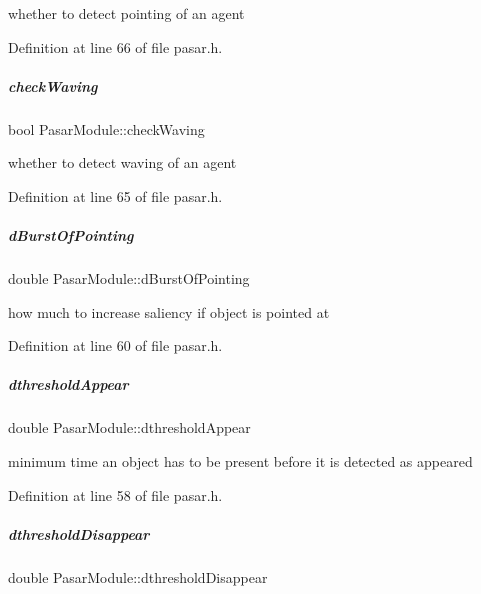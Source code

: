whether to detect pointing of an agent 



Definition at line 66 of file pasar.\+h.

\mbox{\label{group__pasar_a1565ab479eb670f9b0f2fac851d04d4f}} 
\subparagraph{\texorpdfstring{check\+Waving}{checkWaving}}
{\footnotesize\ttfamily bool Pasar\+Module\+::check\+Waving\hspace{0.3cm}{\ttfamily [protected]}}



whether to detect waving of an agent 



Definition at line 65 of file pasar.\+h.

\mbox{\label{group__pasar_a55005305cce26c9b3ace35b7a7cd6d99}} 
\subparagraph{\texorpdfstring{d\+Burst\+Of\+Pointing}{dBurstOfPointing}}
{\footnotesize\ttfamily double Pasar\+Module\+::d\+Burst\+Of\+Pointing\hspace{0.3cm}{\ttfamily [protected]}}



how much to increase saliency if object is pointed at 



Definition at line 60 of file pasar.\+h.

\mbox{\label{group__pasar_a94cc40d7d4e86e835b05c46d2a4ecea0}} 
\subparagraph{\texorpdfstring{dthreshold\+Appear}{dthresholdAppear}}
{\footnotesize\ttfamily double Pasar\+Module\+::dthreshold\+Appear\hspace{0.3cm}{\ttfamily [protected]}}



minimum time an object has to be present before it is detected as appeared 



Definition at line 58 of file pasar.\+h.

\mbox{\label{group__pasar_a1ac4c61e385a04fc07e764d5f09e9ce4}} 
\subparagraph{\texorpdfstring{dthreshold\+Disappear}{dthresholdDisappear}}
{\footnotesize\ttfamily double Pasar\+Module\+::dthreshold\+Disappear\hspace{0.3cm}{\ttfamily [protected]}}



